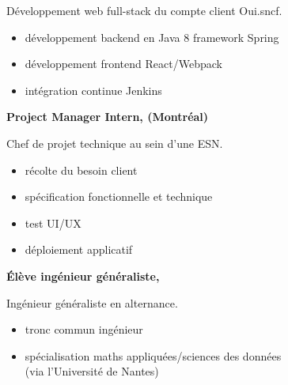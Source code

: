 \documentclass{cv}
\begin{document}
\begin{minipage}[t]{.65\textwidth}
\begin{expbox}[title={déc. 2016, \faicon{clock-o} 3 ans}]
\begin{minipage}[t]{0.8\textwidth}
	Développement web full-stack du compte client Oui.sncf.

	\begin{itemize}
	\item développement backend en Java 8 framework Spring
	\item développement frontend React/Webpack
	\item intégration continue Jenkins
	\end{itemize}
	\end{minipage}

\end{expbox}

\begin{expbox}[title={mai 2018, \faicon{clock-o} 4 mois}]

	\begin{minipage}[t]{\logoboxwidth}
	\centering
	\end{minipage}
	\begin{minipage}[t]{0.8\textwidth}
	\textbf{Project Manager Intern, \adfab{} (Montréal)} 

	Chef de projet technique au sein d'une ESN.

	\begin{itemize}
	\item récolte du besoin client
	\item spécification fonctionnelle et technique
	\item test UI/UX
	\item déploiement applicatif
	\end{itemize}
	\end{minipage}

\end{expbox}

\begin{expbox}[title={2016 -- 2019}]

	\begin{minipage}[t]{\logoboxwidth}
	\centering
	\end{minipage}
	\begin{minipage}[t]{0.8\textwidth}
	\textbf{Élève ingénieur généraliste, \ecn{}} 

	Ingénieur généraliste en alternance.

	\begin{itemize}
	\item tronc commun ingénieur
	\item spécialisation maths appliquées/sciences des données\\ (via l'Université de Nantes)
	\end{itemize}
	\end{minipage}

\end{expbox}
\end{minipage}
\end{document}
